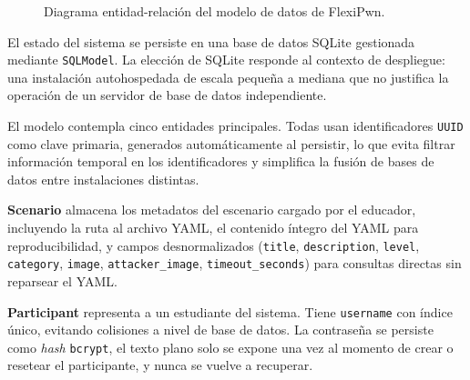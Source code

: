 \begin{figure}[H]
    \centering
    \resizebox{\textwidth}{!}{}
    \caption{Diagrama entidad-relación del modelo de datos de FlexiPwn.}
    \label{fig:erd}
\end{figure}

El estado del sistema se persiste en una base de datos SQLite gestionada
mediante \texttt{SQLModel}. La elección de SQLite responde al contexto de
despliegue: una
instalación autohospedada de escala pequeña a mediana que no justifica la
operación de un servidor de base de datos independiente.

El modelo contempla cinco entidades principales. Todas usan identificadores
\texttt{UUID} como clave primaria, generados automáticamente al persistir, lo
que evita filtrar información temporal en los identificadores y simplifica la
fusión de bases de datos entre instalaciones distintas.

\begin{sloppypar}
\textbf{Scenario} almacena los metadatos del escenario cargado por el educador,
incluyendo la ruta al archivo YAML, el contenido íntegro del YAML para
reproducibilidad, y campos desnormalizados (\texttt{title},
\texttt{description}, \texttt{level}, \texttt{category}, \texttt{image},
\texttt{attacker\_image}, \texttt{timeout\_seconds}) para consultas directas sin
reparsear el YAML.
\end{sloppypar}

\textbf{Participant} representa a un estudiante del sistema. Tiene
\texttt{username} con índice único, evitando colisiones a nivel de base de
datos. La contraseña se persiste como \textit{hash} \texttt{bcrypt}, el texto
plano solo
se expone una vez al momento de crear o resetear el participante, y nunca se
vuelve a recuperar.

